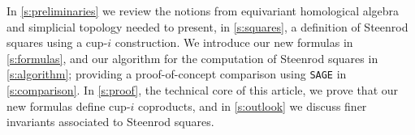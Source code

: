 In \cref{s:preliminaries} we review the notions from equivariant homological algebra and simplicial topology needed to present, in \cref{s:squares}, a definition of Steenrod squares using a cup-$i$ construction.
We introduce our new formulas in \cref{s:formulas}, and our algorithm for the computation of Steenrod squares in \cref{s:algorithm}; providing a proof-of-concept comparison using \verb|SAGE| in \cref{s:comparison}.
In \cref{s:proof}, the technical core of this article, we prove that our new formulas define cup-$i$ coproducts, and in \cref{s:outlook} we discuss finer invariants associated to Steenrod squares.